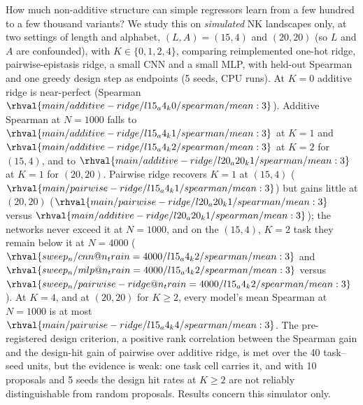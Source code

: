 How much non-additive structure can simple regressors learn from a few hundred to a few thousand variants? We study this on \emph{simulated} NK landscapes only, at two settings of length and alphabet, $(L,A)=(15,4)$ and $(20,20)$ (so $L$ and $A$ are confounded), with $K\in\{0,1,2,4\}$, comparing reimplemented one-hot ridge, pairwise-epistasis ridge, a small CNN and a small MLP, with held-out Spearman and one greedy design step as endpoints (5 seeds,  CPU runs). At $K=0$ additive ridge is near-perfect (Spearman $\rhval{main/additive-ridge/l15_a4_k0/spearman/mean:3}$). Additive Spearman at $N=1000$ falls to $\rhval{main/additive-ridge/l15_a4_k1/spearman/mean:3}$ at $K=1$ and $\rhval{main/additive-ridge/l15_a4_k2/spearman/mean:3}$ at $K=2$ for $(15,4)$, and to $\rhval{main/additive-ridge/l20_a20_k1/spearman/mean:3}$ at $K=1$ for $(20,20)$. Pairwise ridge recovers $K=1$ at $(15,4)$ ($\rhval{main/pairwise-ridge/l15_a4_k1/spearman/mean:3}$) but gains little at $(20,20)$ ($\rhval{main/pairwise-ridge/l20_a20_k1/spearman/mean:3}$ versus $\rhval{main/additive-ridge/l20_a20_k1/spearman/mean:3}$); the networks never exceed it at $N=1000$, and on the $(15,4)$, $K=2$ task they remain below it at $N=4000$ ($\rhval{sweep_n/cnn@n_train=4000/l15_a4_k2/spearman/mean:3}$ and $\rhval{sweep_n/mlp@n_train=4000/l15_a4_k2/spearman/mean:3}$ versus $\rhval{sweep_n/pairwise-ridge@n_train=4000/l15_a4_k2/spearman/mean:3}$). At $K=4$, and at $(20,20)$ for $K\ge2$, every model's mean Spearman at $N=1000$ is at most $\rhval{main/pairwise-ridge/l15_a4_k4/spearman/mean:3}$. The pre-registered design criterion, a positive rank correlation between the Spearman gain and the design-hit gain of pairwise over additive ridge, is met over the 40 task--seed units, but the evidence is weak: one task cell carries it, and with 10 proposals and 5 seeds the design hit rates at $K\ge2$ are not reliably distinguishable from random proposals. Results concern this simulator only.
